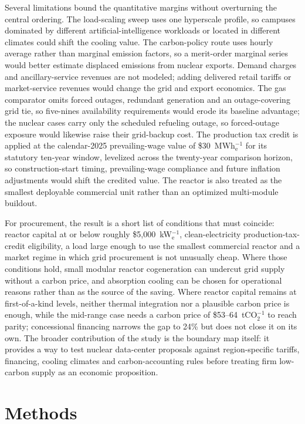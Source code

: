 \documentclass[sn-vancouver,Numbered]{sn-jnl}%
\begin{document}
Several limitations bound the quantitative margins without overturning the central ordering. The load-scaling sweep uses one hyperscale profile, so campuses dominated by different artificial-intelligence workloads or located in different climates could shift the cooling value. The carbon-policy route uses hourly average rather than marginal emission factors, so a merit-order marginal series would better estimate displaced emissions from nuclear exports. Demand charges and ancillary-service revenues are not modeled; adding delivered retail tariffs or market-service revenues would change the grid and export economics. The gas comparator omits forced outages, redundant generation and an outage-covering grid tie, so five-nines availability requirements would erode its baseline advantage; the nuclear cases carry only the scheduled refueling outage, so forced-outage exposure would likewise raise their grid-backup cost. The production tax credit is applied at the calendar-2025 prevailing-wage value of \$30~MWh$_\mathrm{e}^{-1}$ for its statutory ten-year window, levelized across the twenty-year comparison horizon, so construction-start timing, prevailing-wage compliance and future inflation adjustments would shift the credited value. The reactor is also treated as the smallest deployable commercial unit rather than an optimized multi-module buildout.

For procurement, the result is a short list of conditions that must coincide: reactor capital at or below roughly \$5{,}000~kW$_\mathrm{e}^{-1}$, clean-electricity production-tax-credit eligibility, a load large enough to use the smallest commercial reactor and a market regime in which grid procurement is not unusually cheap. Where those conditions hold, small modular reactor cogeneration can undercut grid supply without a carbon price, and absorption cooling can be chosen for operational reasons rather than as the source of the saving. Where reactor capital remains at first-of-a-kind levels, neither thermal integration nor a plausible carbon price is enough, while the mid-range case needs a carbon price of \$53--64~tCO$_2^{-1}$ to reach parity; concessional financing narrows the gap to 24\% but does not close it on its own. The broader contribution of the study is the boundary map itself: it provides a way to test nuclear data-center proposals against region-specific tariffs, financing, cooling climates and carbon-accounting rules before treating firm low-carbon supply as an economic proposition.

\section{Methods}
\label{sec:methods}
\end{document}
